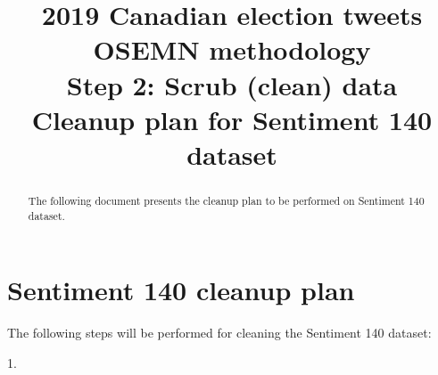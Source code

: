 \documentclass[11pt]{article}
\begin{document}
    \title{2019 Canadian election tweets \\
    OSEMN methodology \\
    Step 2: Scrub (clean) data \\
    Cleanup plan for Sentiment 140 dataset}

    \maketitle

    \begin{abstract}
        The following document presents the cleanup plan to be performed on Sentiment 140 dataset.
    \end{abstract}

    \section{Sentiment 140 cleanup plan} \label{sec:data_prep}

    The following steps will be performed for cleaning the Sentiment 140 dataset:

    1.
\end{document}
